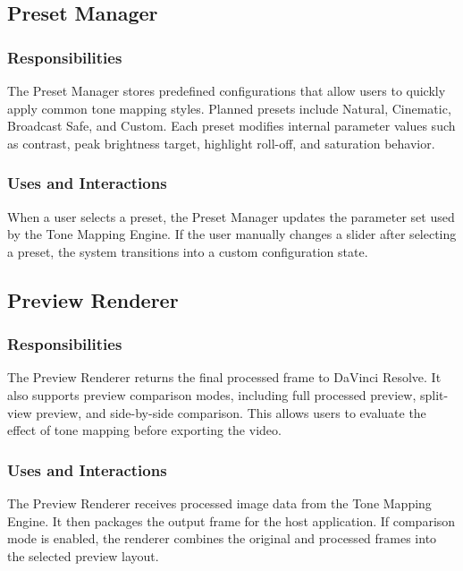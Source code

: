 \documentclass[12pt,hyphens]{article}
\begin{document}
\subsection{Preset Manager}

\subsubsection{Responsibilities}
The Preset Manager stores predefined configurations that allow users to quickly apply common tone mapping styles. Planned presets include Natural, Cinematic, Broadcast Safe, and Custom. Each preset modifies internal parameter values such as contrast, peak brightness target, highlight roll-off, and saturation behavior.

\subsubsection{Uses and Interactions}
When a user selects a preset, the Preset Manager updates the parameter set used by the Tone Mapping Engine. If the user manually changes a slider after selecting a preset, the system transitions into a custom configuration state.

\subsection{Preview Renderer}

\subsubsection{Responsibilities}
The Preview Renderer returns the final processed frame to DaVinci Resolve. It also supports preview comparison modes, including full processed preview, split-view preview, and side-by-side comparison. This allows users to evaluate the effect of tone mapping before exporting the video.

\subsubsection{Uses and Interactions}
The Preview Renderer receives processed image data from the Tone Mapping Engine. It then packages the output frame for the host application. If comparison mode is enabled, the renderer combines the original and processed frames into the selected preview layout.

\end{document}
